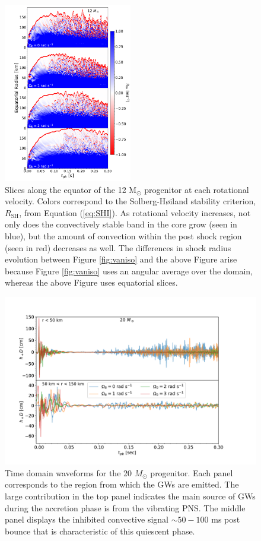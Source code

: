 \documentclass[twocolumn,times]{aastex62}  %
\newcommand{\Msun}{\ensuremath{\mathrm{M}_\odot}\xspace}
\begin{document}
\begin{figure}[]
    \centering
    \includegraphics[width=0.5\textwidth]{SHI_panel_invert.pdf}
    \caption{Slices along the equator of the 12 \Msun progenitor at each rotational velocity.  Colors correspond to the Solberg-H{\o}iland stability criterion, $R_{\mathrm{SH}}$, from Equation (\ref{eq:SHI}).  As rotational velocity increases, not only does the convectively stable band in the core grow (seen in blue), but the amount of convection within the post shock region (seen in red) decreases as well.  The differences in shock radius evolution between Figure \ref{fig:vaniso} and the above Figure arise because Figure \ref{fig:vaniso} uses an angular average over the domain, whereas the above Figure uses equatorial slices.}
    \label{fig:SHI}
\end{figure}

 \begin{figure}[htp]
  \centering     %
  \includegraphics[width=\textwidth]{tdwf_region_20.pdf}
  \caption{Time domain waveforms for the 20 $M_\odot$ progenitor.  Each panel corresponds to the region from which the GWs are emitted.  The large contribution in the top panel indicates the main source of GWs during the accretion phase is from the vibrating PNS.  The middle panel displays the inhibited convective signal $\sim 50-100 $ ms post bounce that is characteristic of this quiescent phase.}
  \label{fig:region}
\end{figure}
\end{document}
